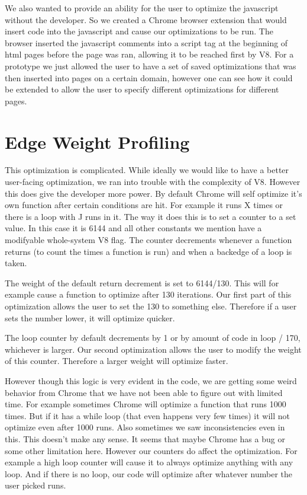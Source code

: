 \documentclass[twocolumn,showpacs,%
  nofootinbib,aps,superscriptaddress,%
  eqsecnum,prd,notitlepage,showkeys,10pt]{revtex4-1}
\begin{document}
We also wanted to provide an ability for the user to optimize the javascript without the developer. So we created a Chrome browser extension that would insert code into the javascript and cause our optimizations to be run. The browser inserted the javascript comments into a script tag at the beginning of html pages before the page was ran, allowing it to be reached first by V8. For a prototype we just allowed the user to have a set of saved optimizations that was then inserted into pages on a certain domain, however one can see how it could be extended to allow the user to specify different optimizations for different pages.

\section{Edge Weight Profiling}
This optimization is complicated. While ideally we would like to have a better user-facing optimization, we ran into trouble with the complexity of V8. However this does give the developer more power. By default Chrome will self optimize it's own function after certain conditions are hit. For example it runs X times or there is a loop with J runs in it. The way it does this is to set a counter to a set value. In this case it is 6144 and all other constants we mention have a modifyable whole-system V8 flag. The counter decrements whenever a function returns (to count the times a function is run) and when a backedge of a loop is taken. 

The weight of the default return decrement is set to 6144/130.  This will for example cause a function to optimize after 130 iterations. Our first part of this optimization allows the user to set the 130 to something else. Therefore if a user sets the number lower, it will optimize quicker.

The loop counter by default decrements by 1 or by amount of code in loop / 170, whichever is larger. Our second optimization allows the user to modify the weight of this counter. Therefore a larger weight will optimize faster.

However though this logic is very evident in the code, we are getting some weird behavior from Chrome that we have not been able to figure out with limited time. For example sometimes Chrome will optimize a function that runs 1000 times. But if it has a while loop (that even happens very few times) it will not optimize even after 1000 runs. Also sometimes we saw inconsistencies even in this. This doesn't make any sense. It seems that maybe Chrome has a bug or some other limitation here. However our counters do affect the optimization. For example a high loop counter will cause it to always optimize anything with any loop. And if there is no loop, our code will optimize after whatever number the user picked runs. 
\end{document}
